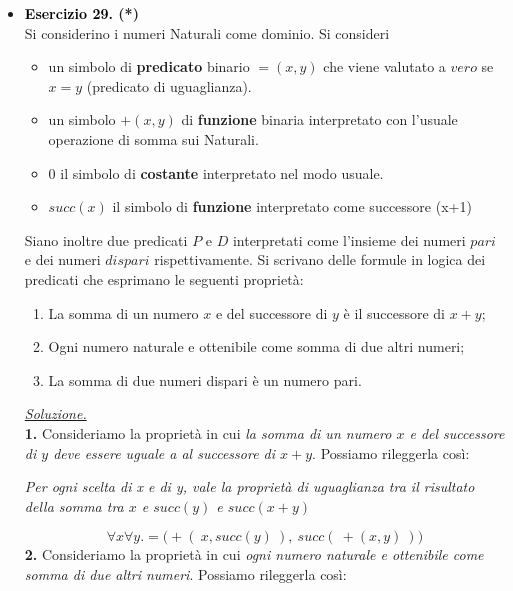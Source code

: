 \documentclass[a4paper,10pt]{article}
\begin{document}
{\begin{itemize}[label=, leftmargin=0pt]
    \item \textbf{\textcolor{black}{Esercizio 29.} (*)}\\ 	
    Si considerino i numeri Naturali come dominio. Si consideri
    \begin{itemize}
        \item un simbolo di \textbf{predicato} binario $= (x, y)$ che viene valutato a $vero$ se $x = y$ (predicato di uguaglianza).
        \item un simbolo $+(x, y)$ di \textbf{funzione} binaria interpretato con l'usuale operazione di somma sui Naturali.
        \item $0$ il simbolo di \textbf{costante} interpretato nel modo usuale.
        \item $succ(x)$ il simbolo di \textbf{funzione} interpretato come successore (x+1)
    \end{itemize}
    Siano inoltre due predicati $P$ e $D$ interpretati come l'insieme dei numeri $pari$ e dei numeri $dispari$ rispettivamente. Si scrivano delle formule in logica dei predicati che esprimano le seguenti proprietà:
    \begin{enumerate}
        \item La somma di un numero $x$ e del successore di $y$ è il successore di $x+y$;
        \item Ogni numero naturale e ottenibile come somma di due altri numeri;
        \item La somma di due numeri dispari è un numero pari.\\[0.1cm]
    \end{enumerate}
    
    \begin{osservazioni}
    \underline{\textit{Soluzione.}}\\
    \textbf{1.} Consideriamo la proprietà in cui \textit{la somma di un numero $x$ e del successore di $y$ deve essere uguale a al successore di $x+y$}. Possiamo rileggerla così:
    \begin{center}
    \textit{Per ogni scelta di x e di y, vale la proprietà di uguaglianza tra il risultato della somma tra $x$ e $succ(y)$ e $succ(x+y)$}
    \end{center}

    $$\forall x \forall y. =\bigg(+(\ x,succ(y)\ ),\ succ(\ +(x,y)\ )\bigg)$$
    \textbf{2.} Consideriamo la proprietà in cui \textit{ogni numero naturale e ottenibile come somma di due altri numeri}. Possiamo rileggerla così:
    

\end{osservazioni}
\end{itemize}}
\end{document}

